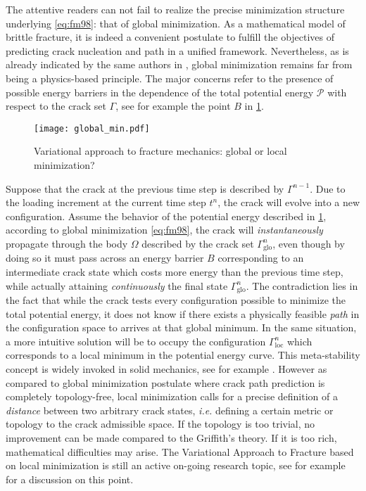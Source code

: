The attentive readers can not fail to realize the precise minimization structure underlying \eqref{eq:fm98}: that of global minimization. As a mathematical model of brittle fracture, it is indeed a convenient postulate to fulfill the objectives of predicting crack nucleation and path in a unified framework. Nevertheless, as is already indicated by the same authors in \cite{FrancfortMarigo:1998,ChambolleFrancfortMarigo:2009}, global minimization remains far from being a physics-based principle. The major concerns refer to the presence of possible energy barriers in the dependence of the total potential energy $\mathcal{P}$ with respect to the crack set $\Gamma$, see for example the point $B$ in \cref{fig:globalmin}.
\begin{figure}[htbp]
\centering
\texttt{[image: global\_min.pdf]}
\caption{Variational approach to fracture mechanics: global or local minimization?} \label{fig:globalmin}
\end{figure}
Suppose that the crack at the previous time step is described by $\Gamma^{n-1}$. Due to the loading increment at the current time step $t^n$, the crack will evolve into a new configuration. Assume the behavior of the potential energy described in \cref{fig:globalmin}, according to global minimization \eqref{eq:fm98}, the crack will \emph{instantaneously} propagate through the body $\Omega$ described by the crack set $\Gamma^n_\mathrm{glo}$, even though by doing so it must pass across an energy barrier $B$ corresponding to an intermediate crack state which costs more energy than the previous time step, while actually attaining \emph{continuously} the final state $\Gamma^n_\mathrm{glo}$. The contradiction lies in the fact that while the crack tests every configuration possible to minimize the total potential energy, it does not know if there exists a physically feasible \emph{path} in the configuration space to arrives at that global minimum. In the same situation, a more intuitive solution will be to occupy the configuration $\Gamma^n_\mathrm{loc}$ which corresponds to a local minimum in the potential energy curve. This meta-stability concept is widely invoked in solid mechanics, see for example \cite{Nguyen:2000}. However as compared to global minimization postulate where crack path prediction is completely topology-free, local minimization calls for a precise definition of a \emph{distance} between two arbitrary crack states, \emph{i.e.} defining a certain metric or topology to the crack admissible space. If the topology is too trivial, no improvement can be made compared to the Griffith's theory. If it is too rich, mathematical difficulties may arise. The Variational Approach to Fracture based on local minimization is still an active on-going research topic, see for example \cite{CharlotteFrancfortMarigoTruskinovsky:2000,Negri:2010aa,ChambolleFrancfortMarigo:2009,Marigo:2010} for a discussion on this point.

